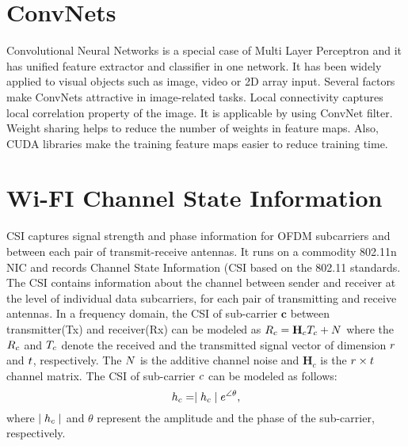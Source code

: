 \label{chp:Survey}

\section{ConvNets}
Convolutional Neural Networks is a special case of Multi Layer Perceptron and it has unified feature extractor and classifier in one network. It has been widely applied to visual objects such as image, video or 2D array input. Several factors make ConvNets attractive in image-related tasks.
Local connectivity captures local correlation property of the image. It is applicable by using ConvNet filter. Weight sharing helps to reduce the number of weights in feature maps.
Also, CUDA libraries make the training feature maps easier to reduce training time.

\section{Wi-FI Channel State Information}
CSI captures signal strength and phase information for OFDM subcarriers and between each pair of transmit-receive antennas.
It runs on a commodity 802.11n NIC and records Channel State Information (CSI based on the 802.11 standards.
The CSI contains information about the channel between sender and receiver at the level of individual data subcarriers, for each pair of transmitting and receive antennas.
In a frequency domain, the CSI of sub-carrier $\mathbf{c}$ between transmitter(Tx) and receiver(Rx) can be modeled as 
$\mathnormal{R}_{c} = \mathbf{H}_{c}\mathnormal{T}_{c} +\mathnormal{N}$ where the $\mathnormal{R}_{c}$ and $\mathnormal{T}_{c}$  denote the received and the transmitted signal vector of dimension $\mathnormal{r}$ and $\mathnormal{t}$, respectively. The $\mathnormal{N}$ is the additive channel noise and $\mathbf{H}_{c}$ is the $\mathnormal{r}\times\mathnormal{t}$ channel matrix. The CSI of sub-carrier $\mathnormal{c}$ can be modeled as follows:
\begin{equation}
    \mathnormal{h}_{c} = \mid\mathnormal{h}_{c}\mid\mathnormal{e}^{\angle\theta},
\end{equation}
where $\mid\mathnormal{h}_{c}\mid$ and $\theta$ represent the amplitude and the phase of the sub-carrier, respectively.
